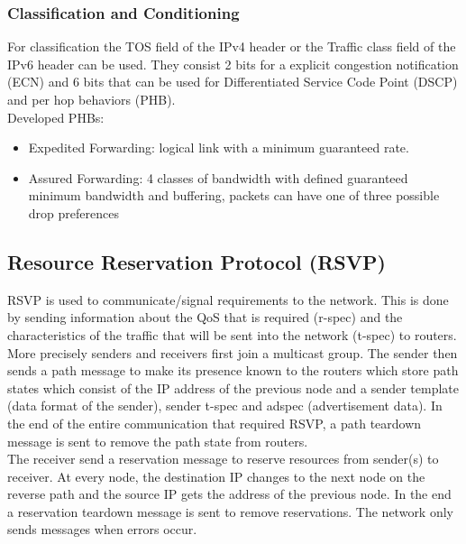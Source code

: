 \subsubsection*{Classification and Conditioning}
For classification the TOS field of the IPv4 header or the Traffic class field of the IPv6 header can be used.
They consist 2 bits for a explicit congestion notification (ECN) and 6 bits that can be used for Differentiated Service Code Point (DSCP) and per hop behaviors (PHB).\\
Developed PHBs:
\begin{itemize}
  \item Expedited Forwarding: logical link with a minimum guaranteed rate.
  \item Assured Forwarding: 4 classes of bandwidth with defined guaranteed minimum bandwidth and buffering, packets can have one of three possible drop preferences
\end{itemize}

\subsection{Resource Reservation Protocol (RSVP)}
RSVP is used to communicate/signal requirements to the network.
This is done by sending information about the QoS that is required (r-spec) and the characteristics of the traffic that will be sent into the network (t-spec) to routers.\\
More precisely senders and receivers first join a multicast group.
The sender then sends a path message to make its presence known to the routers which store path states which consist of the IP address of the previous node and a sender template (data format of the sender), sender t-spec and adspec (advertisement data).
In the end of the entire communication that required RSVP, a path teardown message is sent to remove the path state from routers.\\
The receiver send a reservation message to reserve resources from sender(s) to receiver.
At every node, the destination IP changes to the next node on the reverse path and the source IP gets the address of the previous node.
In the end a reservation teardown message is sent to remove reservations.
The network only sends messages when errors occur.

